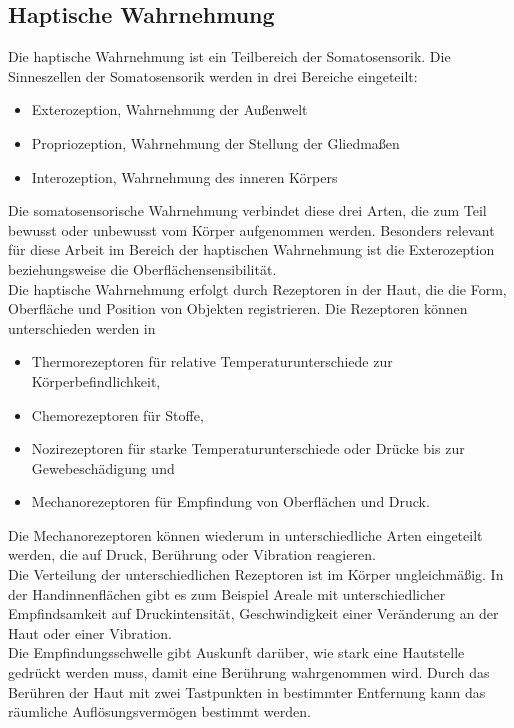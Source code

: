 \subsection{Haptische Wahrnehmung}
Die haptische Wahrnehmung ist ein Teilbereich der Somatosensorik. Die Sinneszellen der Somatosensorik werden in drei Bereiche eingeteilt:
\begin{itemize}
	\item Exterozeption, Wahrnehmung der Außenwelt
	\item Propriozeption, Wahrnehmung der Stellung der Gliedmaßen
	\item Interozeption, Wahrnehmung des inneren Körpers
\end{itemize}
Die somatosensorische Wahrnehmung verbindet diese drei Arten, die zum Teil bewusst oder unbewusst vom Körper aufgenommen werden. Besonders relevant für diese Arbeit im Bereich der haptischen Wahrnehmung ist die Exterozeption beziehungsweise die Oberflächensensibilität. \cite[Vgl. Seite 26]{Sprenger.2020}\\
Die haptische Wahrnehmung erfolgt durch Rezeptoren in der Haut, die die Form, Oberfläche und Position von Objekten registrieren. Die Rezeptoren können unterschieden werden in
\begin{itemize}
	\item Thermorezeptoren für relative Temperaturunterschiede zur Körperbefindlichkeit, 
	\item Chemorezeptoren für Stoffe,
	\item Nozirezeptoren für starke Temperaturunterschiede oder Drücke bis zur Gewebeschädigung und
	\item Mechanorezeptoren für Empfindung von Oberflächen und Druck.
\end{itemize}
Die Mechanorezeptoren können wiederum in unterschiedliche Arten eingeteilt werden, die auf Druck, Berührung oder Vibration reagieren. \cite[Vgl. Seite 26 f.]{Sprenger.2020}\\
Die Verteilung der unterschiedlichen Rezeptoren ist im Körper ungleichmäßig. In der Handinnenflächen gibt es zum Beispiel Areale mit unterschiedlicher Empfindsamkeit \glqq auf Druckintensität, Geschwindigkeit einer Veränderung an der Haut oder einer Vibration. \grqq{} \cite[Seite 29]{Sprenger.2020}\\
Die Empfindungsschwelle gibt Auskunft darüber, wie stark eine Hautstelle gedrückt werden muss, damit eine Berührung wahrgenommen wird. Durch das Berühren der Haut mit zwei Tastpunkten in bestimmter Entfernung kann das räumliche Auflösungsvermögen bestimmt werden. \cite[Vgl. Seite 28]{Sprenger.2020}\\
